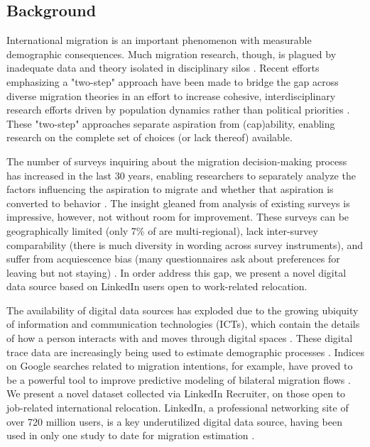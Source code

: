 \subsection*{Background}
International migration is an important phenomenon with measurable demographic consequences. Much migration research, though, is plagued by inadequate data and theory isolated in disciplinary silos \cite{willekensInternationalMigrationMicroscope2016}. Recent efforts emphasizing a "two-step" approach have been made to bridge the gap across diverse migration theories in an effort to increase cohesive, interdisciplinary research efforts driven by population dynamics rather than political priorities \cite{carlingRevisitingAspirationAbility2018, dehaasTheoryMigrationAspirationscapabilities2021}. These "two-step" approaches separate aspiration from (cap)ability, enabling research on the complete set of choices (or lack thereof) available.

The number of surveys inquiring about the migration decision-making process has increased in the last 30 years, enabling researchers to separately analyze the factors influencing the aspiration to migrate and whether that aspiration is converted to behavior \cite{aslanySystematicReviewDeterminants2021}. The insight gleaned from analysis of existing surveys is impressive, however, not without room for improvement. These surveys can be geographically limited (only 7\% of are multi-regional), lack inter-survey comparability (there is much diversity in wording across survey instruments), and suffer from acquiescence bias (many questionnaires ask about preferences for leaving but not staying) \cite{carlingSurveyInstrumentsSurvey2021}. In order address this gap, we present a novel digital data source based on LinkedIn users open to work-related relocation.

The availability of digital data sources has exploded due to the growing ubiquity of information and communication technologies (ICTs), which contain the details of how a person interacts with and moves through digital spaces \cite{cesarePromisesPitfallsUsing2018}. These digital trace data are increasingly being used to estimate demographic processes \cite{alburez-gutierrezDemographyDigitalEra2019}. Indices on Google searches related to migration intentions, for example, have proved to be a powerful tool to improve predictive modeling of bilateral migration flows \cite{bohmeSearchingBetterLife2020, wannerHowWellCan2020}. We present a novel dataset collected via LinkedIn Recruiter, on those open to job-related international relocation. LinkedIn, a professional networking site of over 720 million users, is a key underutilized digital data source, having been used in only one study to date for migration estimation \cite{stateMigrationProfessionals2014}.


